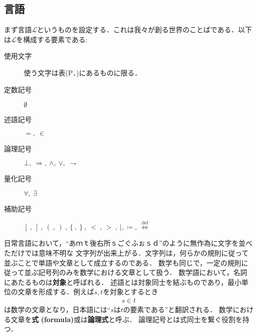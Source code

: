 	\begin{comment}
	\begin{quote}
		初めに言(ことば)があった。言は神と共にあった。言は神であった。\\
		この言は、初めに神と共にあった。\\
		万物は言によって成った。成ったもので、言によらずに成ったものは何一つなかった。
	\end{quote}
	ヨハネによる福音書の冒頭である．数学の世界もまたことばが支配する．
	ただし数学の世界におけることばには二つの階層がある．一つは記号や記号の並べ方を規定する下位のことばであり，
	もう一つは何が定理であるかを規定する上位のことばである．
	前者は我々が神の視点で創る世界のことばであり，後者は神である我々の世界のことばであるが，
	後者は論理と言い換える方が適当である．
	我々が創る世界は集合論と呼ばれ，数や関数など高校まで初等的に与えられてきたあらゆる概念がその世界の中で説明し直されることになる．
	我々が論理的思考を持っていたり自然にものを数えたり出来るのは，この世が神なる数学者によって創られたからであると信じて，
	本稿ではそういった生来の直感の一切合切を排して更地に立って数学を組み立てる．
	それは我々の我々による我々のための数学の世界である．つまり我々は本稿の神たる者となる．
	
	\end{comment}
	
\subsection{言語}
	
	まず言語$\mathcal{L}$というものを設定する．これは我々が創る世界のことばである．以下は$\mathcal{L}$を構成する要素である:
	\begin{description}
		\item[使用文字] 使う文字は表(P．\pageref{tab:alphabet})にあるものに限る．
		\item[定数記号] $\emptyset$
		\item[述語記号] $=,\ \in$
		\item[論理記号] $\bot,\ \Longrightarrow,\ \wedge,\ \vee,\ \rightharpoondown$
		\item[量化記号] $\forall,\ \exists$
		\item[補助記号] $[\ ,\ ]\ ,\ (\ ,\ )\ ,\ \{\ ,\ \}\ ,\ <\ ,\ >\ ,\ |,\coloneqq,\ \overset{\mathrm{def}}{\Longleftrightarrow}$
	\end{description}
	
	日常言語において，``あｍｔ後右所ｓごぐふぉｓｄ''のように無作為に文字を並べただけでは意味不明な
	文字列が出来上がる．文字列は，何らかの規則に従って並ぶことで単語や文章として成立するのである．
	数学も同じで，一定の規則に従って並ぶ記号列のみを数学における文章として扱う．
	数学語において，名詞にあたるものは{\bf 対象}と呼ばれる．
	述語とは対象同士を結ぶものであり，最小単位の文章を形成する．例えば$s,t$を対象とするとき
	\begin{align}
		s \in t
	\end{align}
	は数学の文章となり，日本語には``$s$は$t$の要素である''と翻訳される．
	数学における文章を{\bf 式}
	{\bf (formula)}或は{\bf 論理式}と呼ぶ．
	論理記号とは式同士を繋ぐ役割を持つ．
	
